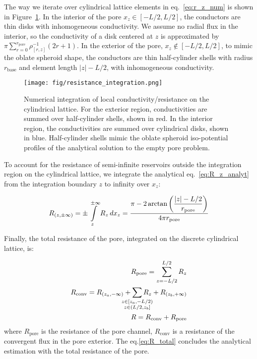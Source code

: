 \documentclass[10pt, a4paper]{article}
\begin{document}
\begin{multicols}{2}
The way we iterate over cylindrical lattice elements in eq.~\ref{eq:r_z_num} is shown in Figure~\ref{fig:integration_scheme}.
In the interior of the pore $x_z \in [-L/2, L/2]$, the conductors are thin disks with inhomogeneous conductivity.
We assume no radial flux in the interior, so the conductivity of a disk centered at $z$ is approximated by $\pi \sum_{r=0}^{r_{\textrm{pore}}} \rho^{-1}_{[r,z]} (2r + 1)$.
In the exterior of the pore, $x_z \notin [-L/2, L/2]$, to mimic the oblate spheroid shape, the conductors are thin half-cylinder shells with radius $r_{\textrm{base}}$ and element length $|z| - L/2$, with inhomogeneous conductivity.
\begin{figure}[H]
    \centering
    \texttt{[image: fig/resistance\_integration.png]}
    \caption{
        Numerical integration of local conductivity/resistance on the cylindrical lattice.
        For the exterior region, conductivities are summed over half-cylinder shells, shown in red.
        In the interior region, the conductivities are summed over cylindrical disks, shown in blue.
        Half-cylinder shells mimic the oblate spheroid iso-potential profiles of the analytical solution to the empty pore problem.
        }
    \label{fig:integration_scheme}
\end{figure}

To account for the resistance of semi-infinite reservoirs outside the integration region on the cylindrical lattice, we integrate the analytical eq.~\ref{eq:R_z_analyt} from the integration boundary $z$ to infinity over $x_z$:

\begin{eqnarray}
    \label{eq:r_reservoir}
    R_{(z, \pm\infty)} = \pm \int\displaylimits_{z}^{\pm\infty} R_z \, dx_z = \dfrac{\pi - 2 \arctan\left( \dfrac{|z| - L/2}{r_{\textrm{pore}}} \right)}{4 \pi r_{\textrm{pore}}}
\end{eqnarray}

Finally, the total resistance of the pore, integrated on the discrete cylindrical lattice, is:

\begin{eqnarray}
    R_{\textrm{pore}} = \sum_{z=-L/2}^{L/2} R_z
    \\
    R_{\textrm{conv}} = R_{(z_{a}, -\infty)} + \sum\limits_{\mathclap{\substack{z \in [z_{a},-L/2)\\z \in (L/2, z_b]}}} R_z + R_{(z_{b}, +\infty)}
    \\
    \label{eq:R_total}
    R = R_{\textrm{conv}} + R_{\textrm{pore}}
\end{eqnarray}
where $R_{\textrm{pore}}$ is the resistance of the pore channel, $R_{\textrm{conv}}$ is a resistance of the convergent flux in the pore exterior.
The eq.\ref{eq:R_total} concludes the analytical estimation with the total resistance of the pore.


\end{multicols}
\end{document}
